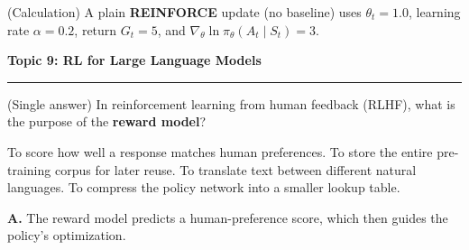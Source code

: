 \documentclass[answers,addpoints]{exam}
\newcommand{\topic}[2]{%
  \vspace{1.0\baselineskip}%
  \noindent\textbf{\large Topic #1: #2}\par
  \noindent\rule{\linewidth}{0.4pt}\par
  \vspace{0.4\baselineskip}}
\begin{document}
\begin{questions}
\question[5] (Calculation) A plain \textbf{REINFORCE} update (no baseline) uses
$\theta_t=1.0$, learning rate $\alpha=0.2$, return $G_t=5$, and
$\nabla_\theta\ln\pi_\theta(A_t\mid S_t)=3$.

\topic{9}{RL for Large Language Models}

\question[2] (Single answer) In reinforcement learning from human feedback (RLHF),
what is the purpose of the \textbf{reward model}?
\begin{choices}
  \CorrectChoice To score how well a response matches human preferences.
  \choice To store the entire pre-training corpus for later reuse.
  \choice To translate text between different natural languages.
  \choice To compress the policy network into a smaller lookup table.
\end{choices}
\begin{solution}\textbf{A.} The reward model predicts a human-preference score, which
then guides the policy's optimization.\end{solution}


\end{questions}
\end{document}
